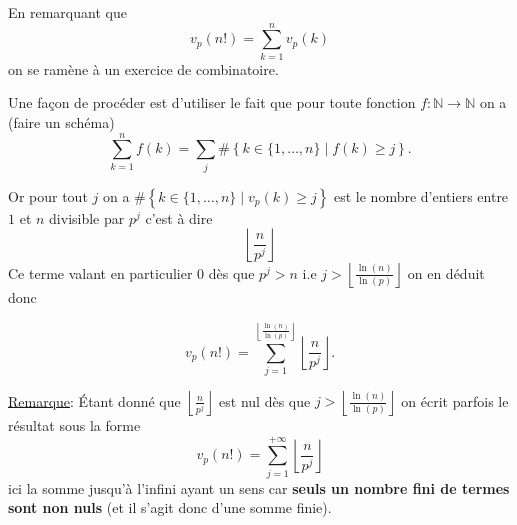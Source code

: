 \begin{sol}
    En remarquant que
    \[v_p(n!) = \sum_{k=1}^n v_p(k)\]
    on se ramène à un exercice de combinatoire.

    Une façon de procéder est d'utiliser le fait que pour toute fonction $f : \mathbb{N} \to \mathbb{N}$ on a (faire un schéma)
    \[\sum_{k=1}^n f(k) = \sum_j \# \left\lbrace k \in \{1,\ldots,n\} \mid f(k) \geq j\right\rbrace.\]

    Or pour tout $j$  on a $\# \left\lbrace k \in \{1,\ldots,n\} \mid v_p(k) \geq j\right\rbrace$ est le nombre d'entiers entre $1$ et $n$ divisible par $p^j$ c'est à dire
    \[\left\lfloor \frac{n}{p^j} \right\rfloor\]
    Ce terme valant en particulier  $0$ dès que $p^j > n$ i.e $j > \left\lfloor \frac{\ln(n)}{\ln(p)} \right\rfloor$ on en déduit donc

    \[\boxed{v_p(n!) = \sum_{j=1}^{\left\lfloor \frac{\ln(n)}{\ln(p)} \right\rfloor} \left\lfloor \frac{n}{p^j} \right\rfloor}.\]

    \underline{Remarque}: Étant donné que $\left\lfloor \frac{n}{p^j} \right\rfloor$ est nul dès que $j > \left\lfloor \frac{\ln(n)}{\ln(p)} \right\rfloor$ on écrit parfois le résultat sous la forme
    \[{v_p(n!) = \sum_{j=1}^{+\infty}  \left\lfloor \frac{n}{p^j} \right\rfloor}\]
    ici la somme jusqu'à l'infini ayant un sens car \textbf{seuls un nombre fini de termes sont non nuls} (et il s'agit donc d'une somme finie).
\end{sol}
